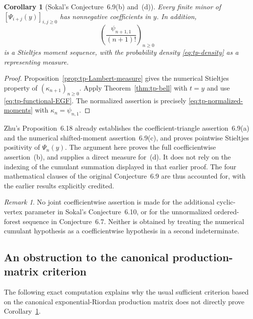 \documentclass[11pt,a4paper]{article}
\newtheorem{corollary}[theorem]{Corollary}
\theoremstyle{definition}
\theoremstyle{remark}
\newtheorem{remark}[theorem]{Remark}
\numberwithin{equation}{section}
\begin{document}
\begin{corollary}[Sokal's Conjecture~6.9(b) and~(d)]
\label{cor:tp-Sokal}
Every finite minor of $[\Psi_{i+j}(y)]_{i,j\geq0}$ has nonnegative
coefficients in $y$.  In addition,
\[
 \left(\frac{\psi_{n+1,1}}{(n+1)!}\right)_{n\geq0}
\]
is a Stieltjes moment sequence, with the probability density
\eqref{eq:tp-density} as a representing measure.
\end{corollary}
\begin{proof}
Proposition~\ref{prop:tp-Lambert-measure} gives the numerical Stieltjes
property of $(\kappa_{n+1})_{n\geq0}$.  Apply
Theorem~\ref{thm:tp-bell} with $t=y$ and use
\eqref{eq:tp-functional-EGF}.  The normalized assertion is precisely
\eqref{eq:tp-normalized-moments} with $\kappa_n=\psi_{n,1}$.
\end{proof}

Zhu's Proposition~6.18 \cite{Zhu2024} already establishes the
coefficient-triangle assertion~6.9(a) and the numerical shifted-moment
assertion~6.9(c), and proves pointwise Stieltjes positivity of
$\Psi_n(y)$.  The argument here proves the full coefficientwise
assertion~(b), and supplies a direct measure for~(d).  It does not rely
on the indexing of the cumulant summation displayed in that earlier
proof.  The four mathematical clauses of the original Conjecture~6.9
are thus accounted for, with the earlier results explicitly credited.

\begin{remark}
No joint coefficientwise assertion is made for the additional
cyclic-vertex parameter in Sokal's Conjecture~6.10, or for the
unnormalized ordered-forest sequence in Conjecture~6.7.  Neither is
obtained by treating the numerical cumulant hypothesis as a
coefficientwise hypothesis in a second indeterminate.
\end{remark}

\subsection{An obstruction to the canonical production-matrix criterion}

The following exact computation explains why the usual sufficient
criterion based on the canonical exponential-Riordan production matrix
does not directly prove Corollary~\ref{cor:tp-Sokal}.
\end{document}
